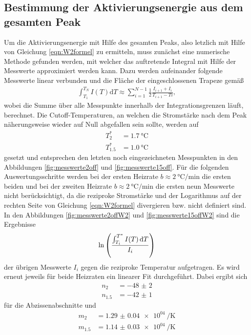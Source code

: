 \subsection{Bestimmung der Aktivierungsenergie aus dem gesamten Peak}

Um die Aktivierungsenergie mit Hilfe des gesamten Peaks, also letzlich mit Hilfe
von Gleichung \ref{eqn:W2formel} zu ermitteln, muss zunächst eine numerische Methode
gefunden werden, mit welcher das auftretende Integral mit Hilfe der Messwerte
approximiert werden kann. Dazu werden aufeinander folgende Messwerte linear
verbunden und die Fläche der eingeschlossenen Trapeze gemäß
\begin{align}
  \int_{T_1}^{T_N} I(T) \mathrm{d}T \approx \sum_{i=1}^{N-1} \frac12 \frac{I_{i+1}+I_{i}}{T_{i+1}-T{i}},
\end{align}
wobei die Summe über alle Messpunkte innerhalb der Integrationsgrenzen läuft, berechnet.
Die Cutoff-Temperaturen, an welchen die Stromstärke nach dem Peak näherungsweise wieder auf Null
abgefallen sein sollte, werden auf
\begin{align}
  T^*_{2} &= \SI{1.7}{\celsius} \\
  T^*_{1.5} &= \SI{1.0}{\celsius}
\end{align}
gesetzt und entsprechen den letzten noch eingezeichneten Messpunkten in den Abbildungen
\ref{fig:messwerte2off} und \ref{fig:messwerte15off}. Für die folgenden Auswertungsschritte
werden bei der ersten Heizrate $b \approx \SI{2}{\celsius\per\minute}$ die ersten beiden
und bei der zweiten Heizrate $b \approx \SI{2}{\celsius\per\minute}$ die ersten neun Messwerte
nicht berücksichtigt, da die reziproke Stromstärke und der Logarithmus auf der rechten Seite
von Gleichung \eqref{eqn:W2formel} divergieren bzw. nicht definiert sind.
In den Abbildungen \ref{fig:messwerte2offW2} und \ref{fig:messwerte15offW2} sind die Ergebnisse
\begin{align}
  \ln \left(\frac{\int_{T_i}^{T^*} I(T)\mathop{}\!\mathrm{d} T}{I_i}\right)
\end{align}
der übrigen Messwerte $I_{i}$ gegen die reziproke Temperatur aufgetragen. Es wird erneut
jeweils für beide Heizraten ein linearer Fit durchgeführt. Dabei ergibt sich
\begin{align}
  n_{2} &= \num{-48(2)} \\
  n_{1.5} &= \num{-42(1)}
\end{align}
für die Abzissenabschnitte und
\begin{align}
  m_{2} &= \SI{1.29(4)e04}{\per\kelvin} \\
  m_{1.5} &= \SI{1.14(3)e04}{\per\kelvin}
\end{align}

